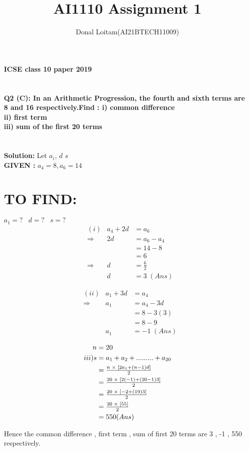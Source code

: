 \documentclass[journal, 12pt, twocolumn]{IEEEtran}
\title{AI1110 Assignment 1}
\author{Donal Loitam(AI21BTECH11009)}
\begin{document}
    \maketitle

    \textbf{\large{ICSE class 10 paper 2019}}\\
    \\
    \\
    \textbf{Q2 (C):
    In an Arithmetic Progression, the fourth and sixth terms are 8 and 16 respectively.Find :
 i) common difference\\
 ii) first term\\
 iii) sum of the first 20 terms}\\\\\\
    \textbf{\large{Solution:}}
    Let $a_i$, 
 \(d\) 
\(s\)\\
    
    \textbf{GIVEN :}
    {$a_4 = 8 , a_6 = 14$}
    \section{\textbf{TO FIND:}}
  $ a_1 = ?\;\;\;d = ?\;\;\;s = ? $ \\
    
    \begin{align*}
        &(i)&a_4 + 2d &= a_6\\
        &\Rightarrow & 2d &= a_6 - a_4\\
        &            &    &= 14 - 8\\
        &            &    &= 6 \\
        &\Rightarrow & d  &= \tfrac{6}{2} \\
        &            & d  &= 3 \; (Ans)
    \end{align*}
    
   \begin{align*}
        &(ii)&a_1 + 3d &= a_4\\
        &\Rightarrow & a_1 &= a_4 - 3d\\
        &            &     &=  8 - 3(3)\\
        &            &     &=  8 - 9 \\
        &            & a_1 &=  -1 \; (Ans)
    \end{align*}
    
    \pagebreak
   
    \begin{align*}
\LARGE        n &= 20 \\ 
        iii)  s &= a_1 + a_2 + ......... + a_{20}\\
               &= \tfrac{n\;\times\;\left[2a_1 + (n-1)d\right]}{2} \\
               &= \tfrac{20\;\times\;[2(-1) + (20-1)3] }{2} \\
               &= \tfrac{20\;\times\;[-2 + (19)3]}{2} \\
               &= \tfrac{20\; \times  \;[55]}{2} \\
               &= 550 (Ans)
\end{align*} 

Hence the common difference , first term , sum of first 20 terms are  3 , -1 , 550 respectively.
    
\end{document}
